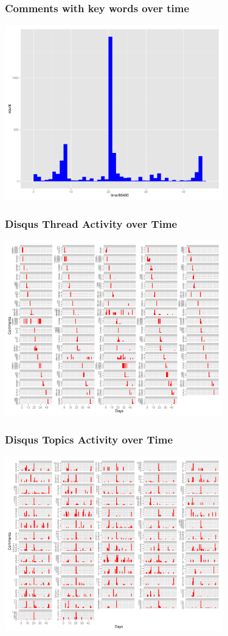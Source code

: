 \documentclass{beamer}
\begin{document}
\begin{frame}\frametitle{Comments with key words over time}
  \begin{center}
    \includegraphics[width=9.5cm]{./imgs/time.pdf}
  \end{center}
\end{frame}

\begin{frame}\frametitle{Disqus Thread Activity over Time}
  \begin{center}
    \includegraphics[width=9.5cm]{./imgs/timebythread.pdf}
  \end{center}
\end{frame}

\begin{frame}\frametitle{Disqus Topics Activity over Time}
  \begin{center}
    \includegraphics[width=9.5cm]{./imgs/timebycluster.pdf}
  \end{center}
\end{frame}
\end{document}
